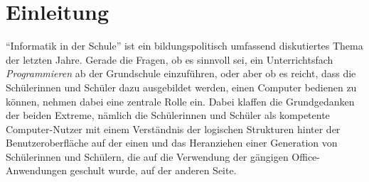 \documentclass[paper=a4, pagesize, DIV=calc, BCOR=15.5mm, twoside=on, onecolumn=on, open = right, titlepage =on, parskip =half-, headsepline = on, footsepline = on, chapterprefix = on, appendixprefix = off, fontsize = 12pt, numbers = noenddot, abstract = on]{scrbook}
\numberwithin{equation}{chapter}
\theoremstyle{definition}
\theoremstyle{plain}
\theoremstyle{plain}
\theoremstyle{remark}
\theoremstyle{plain}
\theoremstyle{plain}
\begin{document}
\newpage
\thispagestyle{plain}

\newcommand*\diff{\mathop{}\!\mathrm{d}}



\thispagestyle{empty}
\cleardoublepage



\newpage
\listoffigures
\newpage
\tableofcontents
\thispagestyle{empty}
\cleardoublepage
\newpage
{}
\par \singlespacing
\chapter{Einleitung}
\onehalfspacing
"`Informatik in der Schule"' ist ein bildungspolitisch umfassend diskutiertes Thema der letzten Jahre. Gerade die Fragen, ob es sinnvoll sei, ein Unterrichtsfach \emph{Programmieren} ab der Grundschule einzuführen, oder aber ob es reicht, dass die Schülerinnen und Schüler dazu ausgebildet werden, einen Computer bedienen zu können, nehmen dabei eine zentrale Rolle ein. Dabei klaffen die Grundgedanken der beiden Extreme, nämlich die Schülerinnen und Schüler als kompetente Computer-Nutzer mit einem Verständnis der logischen Strukturen hinter der Benutzeroberfläche auf der einen und das Heranziehen einer Generation von Schülerinnen und Schülern, die auf die Verwendung der gängigen Office-Anwendungen geschult wurde, auf der anderen Seite.
\end{document}
